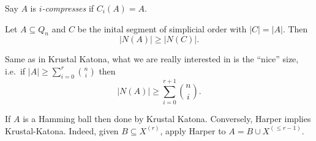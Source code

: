 \documentclass[a4paper]{article}
\begin{document}
Say \(A\) is \emph{\(i\)-compresses} if \(C_i(A) = A\).

\begin{theorem}[Harper]
  Let \(A \subseteq Q_n\) and \(C\) be the inital segment of simplicial order with \(|C| = |A|\). Then
  \[
    |N(A)| \geq |N(C)|.
  \]
\end{theorem}

Same as in Krustal Katona, what we are really interested in is the ``nice'' size, i.e.\ if \(|A| \geq \sum_{i = 0}^r \binom{n}{i}\) then
\[
  |N(A)| \geq \sum_{i = 0}^{r + 1} \binom{n}{i}.
\]

\begin{remark}\leavevmode
  If \(A\) is a Hamming ball then done by Krustal Katona. Conversely, Harper implies Krustal-Katona. Indeed, given \(B \subseteq X^{(r)}\), apply Harper to \(A = B \cup X^{(\leq r - 1)}\).
\end{remark}

\end{document}
